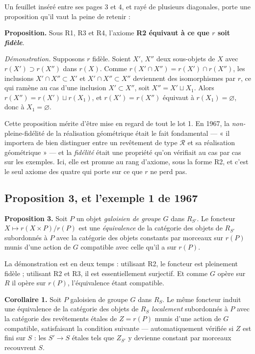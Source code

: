 \documentclass[11pt,a4paper]{article}
\begin{document}
Un feuillet inséré entre ses pages 3 et 4, et rayé de plusieurs diagonales,
porte une proposition qu'il vaut la peine de retenir :

\textbf{Proposition.} Sous R1, R3 et R4, l'axiome \textbf{R2 équivaut à ce que
$r$ soit \emph{fidèle}}.

\emph{Démonstration.} Supposons $r$ fidèle. Soient $X'$, $X''$ deux sous-objets
de $X$ avec $r(X') \supset r(X'')$ dans $r(X)$. Comme
$r(X' \cap X'') = r(X') \cap r(X'')$, les inclusions
$X' \cap X'' \subset X'$ et $X' \cap X'' \subset X''$ deviennent des
isomorphismes par $r$, ce qui ramène au cas d'une inclusion
$X' \subset X''$, soit $X'' = X' \sqcup X_{1}$. Alors
$r(X'') = r(X') \sqcup r(X_{1})$, et $r(X') = r(X'')$ équivaut à
$r(X_{1}) = \varnothing$, donc à $X_{1} = \varnothing$.

Cette proposition mérite d'être mise en regard de tout le lot 1. En 1967, la
\emph{non-}pleine-fidélité de la réalisation géométrique était le fait
fondamental --- « il importera de bien distinguer entre un revêtement de type
$\mathcal{R}$ et sa réalisation géométrique » --- et la \emph{fidélité} était
une propriété qu'on vérifiait au cas par cas sur les exemples. Ici, elle est
promue au rang d'axiome, sous la forme R2, et c'est le seul axiome des quatre
qui porte sur ce que $r$ ne perd pas.

\subsection*{Proposition 3, et l'exemple 1 de 1967}

\textbf{Proposition 3.} Soit $P$ un objet \emph{galoisien de groupe $G$} dans
$R_{S'}$. Le foncteur $X \mapsto r(X \times P)/r(P)$ est une \emph{équivalence}
de la catégorie des objets de $R_{S'}$ subordonnés à $P$ avec la catégorie des
objets constants par morceaux sur $r(P)$ munis d'une action de $G$ compatible
avec celle qu'il a sur $r(P)$.

La démonstration est en deux temps : utilisant R2, le foncteur est pleinement
fidèle ; utilisant R2 et R3, il est essentiellement surjectif. Et comme $G$
opère sur $R$ il opère sur $r(P)$, l'équivalence étant compatible.

\textbf{Corollaire 1.} Soit $P$ galoisien de groupe $G$ dans $R_{S}$. Le même
foncteur induit une équivalence de la catégorie des objets de $R_{S}$
\emph{localement} subordonnés à $P$ avec la catégorie des revêtements étales de
$Z = r(P)$ munis d'une action de $G$ compatible, satisfaisant la condition
suivante --- automatiquement vérifiée si $Z$ est fini sur $S$ : les $S' \to S$
étales tels que $Z_{S'}$ y devienne constant par morceaux recouvrent $S$.
\end{document}
